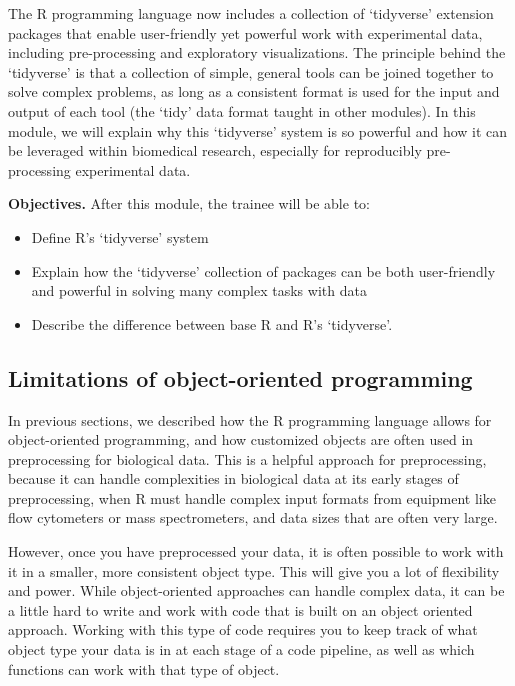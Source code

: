 \documentclass[]{tufte-book}
\providecommand{\tightlist}{%
  \setlength{\itemsep}{0pt}\setlength{\parskip}{0pt}}
\begin{document}
The R programming language now includes a collection of `tidyverse' extension
packages that enable user-friendly yet powerful work with experimental data,
including pre-processing and exploratory visualizations. The principle behind
the `tidyverse' is that a collection of simple, general tools can be joined
together to solve complex problems, as long as a consistent format is used for
the input and output of each tool (the `tidy' data format taught in other
modules). In this module, we will explain why this `tidyverse' system is so
powerful and how it can be leveraged within biomedical research, especially for
reproducibly pre-processing experimental data.

\textbf{Objectives.} After this module, the trainee will be able to:

\begin{itemize}
\tightlist
\item
  Define R's `tidyverse' system
\item
  Explain how the `tidyverse' collection of packages can be both user-friendly
  and powerful in solving many complex tasks with data
\item
  Describe the difference between base R and R's `tidyverse'.
\end{itemize}

\hypertarget{limitations-of-object-oriented-programming}{%
\subsection{Limitations of object-oriented programming}\label{limitations-of-object-oriented-programming}}

In previous sections, we described how the R programming language allows for
object-oriented programming, and how customized objects are often used in
preprocessing for biological data. This is a helpful approach for preprocessing,
because it can handle complexities in biological data at its early stages of
preprocessing, when R must handle complex input formats from equipment like
flow cytometers or mass spectrometers, and data sizes that are often very large.

However, once you have preprocessed your data, it is often possible to work with it
in a smaller, more consistent object type. This will give you a lot of flexibility
and power. While object-oriented approaches can handle complex data, it can be a
little hard to write and work with code that is built on an object oriented approach.
Working with this type of code requires you to keep track of what object type your
data is in at each stage of a code pipeline, as well as which functions can work with
that type of object.
\end{document}
